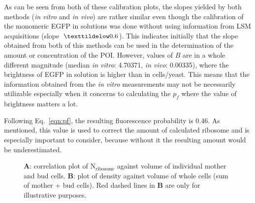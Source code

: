 As can be seen from both of these calibration plots, the slopes yielded by both methods (\textit{in vitro} and \textit{in vivo}) are rather similar even though the calibration of the monomeric EGFP in solutions was done without using information from LSM acquisitions (slope~$\texttildelow 0.6$). 
This indicates initially that the slope obtained from both of this methods can be used in the determination of the amount or concentration of the POI. However, values of $B$ are in a whole different magnitude (median \textit{in vitro}: 4.70371, \textit{in vivo}: 0.00335), where the brightness of EGFP in solution is higher than in cells/yeast. 
This means that the information obtained from the \textit{in vitro} measurements may not be necessarily utilizable especially when it concerns to calculating the $p_{f}$ where the value of brightness matters a lot.

Following Eq.~\ref{eqn:pf}, the resulting fluorescence probability is 0.46. As mentioned, this value is used to correct the amount of calculated ribosome and is especially important to consider, because without it the resulting amount would be underestimated.

\begin{figure}[!h]
\centering
{}\hfill
{}
\caption{\textbf{A}: correlation plot of N$_{\text{ribosome}}$ against volume of individual mother and bud cells. 
\textbf{B}: plot of density against volume of whole cells (sum of mother + bud cells). 
Red dashed lines in \textbf{B} are only for illustrative purposes. }
\label{fig:corplot}
\end{figure}

